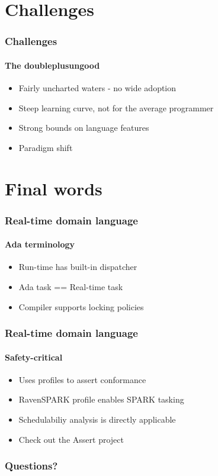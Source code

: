 \documentclass[presentation]{beamer}   %
\begin{document}
\section{Challenges}
\begin{frame}
  \frametitle{Challenges}
  \framesubtitle{The doubleplusungood}
  \begin{itemize}
        \item Fairly uncharted waters - no wide adoption
        \item Steep learning curve, not for the average programmer
        \item Strong bounds on language features
        \item Paradigm shift
      \end{itemize}       
\end{frame}

\section{Final words}
\begin{frame}
  \frametitle{Real-time domain language}
  \framesubtitle{Ada terminology}
  \begin{itemize}
     \item Run-time has built-in dispatcher
     \item Ada task == Real-time task
     \item Compiler supports locking policies
   \end{itemize}       
\end{frame}

\begin{frame}
  \frametitle{Real-time domain language}
  \framesubtitle{Safety-critical}
  \begin{itemize}
     \item Uses profiles to assert conformance
     \item RavenSPARK profile enables SPARK tasking
     \item Schedulabiliy analysis is directly applicable
     \item Check out the Assert project
   \end{itemize}       
\end{frame}



\begin{frame}
  \frametitle{Questions?}
  \framesubtitle{}
      
\end{frame}
\end{document}
